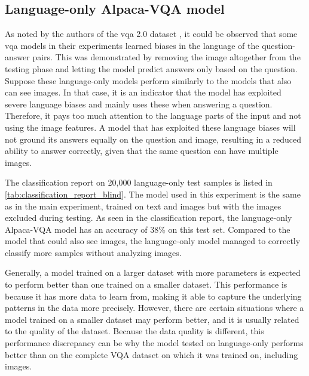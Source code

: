     


    \subsection{Language-only Alpaca-VQA model}
    \label{sec4_language_only_model}
        
        As noted by the authors of the \gls{vqa} 2.0 dataset \cite{goyalMakingVQAMatter2017}, it could be observed that some \gls{vqa} models in their experiments learned biases in the language of the question-answer pairs. This was demonstrated by removing the image altogether from the testing phase and letting the model predict answers only based on the question. Suppose these language-only models perform similarly to the models that also can see images. In that case, it is an indicator that the model has exploited severe language biases and mainly uses these when answering a question. Therefore, it pays too much attention to the language parts of the input and not using the image features.
        A model that has exploited these language biases will not ground its answers equally on the question and image, resulting in a reduced ability to answer correctly, given that the same question can have multiple images.

        The classification report on 20,000 language-only test samples is listed in \autoref{tab:classification_report_blind}.
        The model used in this experiment is the same as in the main experiment, trained on text and images but with the images excluded during testing. 
        As seen in the classification report, the language-only Alpaca-VQA model has an accuracy of 38\% on this test set. Compared to the model that could also see images, the language-only model managed to correctly classify more samples without analyzing images.

        Generally, a model trained on a larger dataset with more parameters is expected to perform better than one trained on a smaller dataset. This performance is because it has more data to learn from, making it able to capture the underlying patterns in the data more precisely. 
        However, there are certain situations where a model trained on a smaller dataset may perform better, and it is usually related to the quality of the dataset. Because the data quality is different, this performance discrepancy can be why the model tested on language-only performs better than on the complete VQA dataset on which it was trained on, including images. 
        

